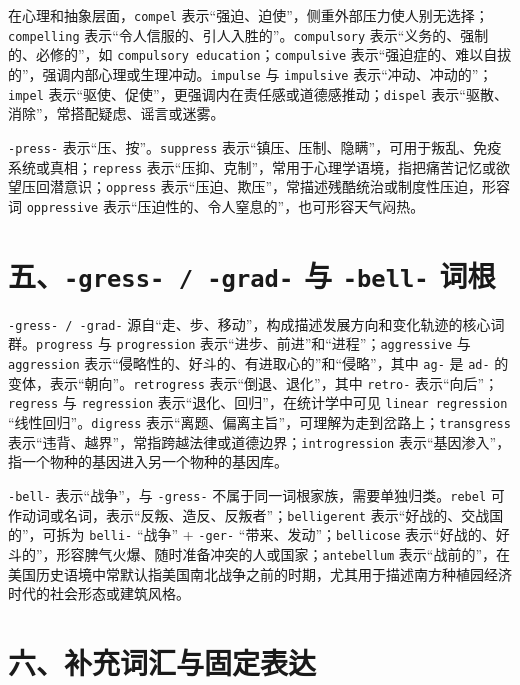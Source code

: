 \documentclass[UTF8,zihao=-4]{ctexart}
\begin{document}
在心理和抽象层面，\texttt{compel} 表示“强迫、迫使”，侧重外部压力使人别无选择；\texttt{compelling} 表示“令人信服的、引人入胜的”。\texttt{compulsory} 表示“义务的、强制的、必修的”，如 \texttt{compulsory education}；\texttt{compulsive} 表示“强迫症的、难以自拔的”，强调内部心理或生理冲动。\texttt{impulse} 与 \texttt{impulsive} 表示“冲动、冲动的”；\texttt{impel} 表示“驱使、促使”，更强调内在责任感或道德感推动；\texttt{dispel} 表示“驱散、消除”，常搭配疑虑、谣言或迷雾。

\texttt{-press-} 表示“压、按”。\texttt{suppress} 表示“镇压、压制、隐瞒”，可用于叛乱、免疫系统或真相；\texttt{repress} 表示“压抑、克制”，常用于心理学语境，指把痛苦记忆或欲望压回潜意识；\texttt{oppress} 表示“压迫、欺压”，常描述残酷统治或制度性压迫，形容词 \texttt{oppressive} 表示“压迫性的、令人窒息的”，也可形容天气闷热。

\section*{五、\texttt{-gress- / -grad-} 与 \texttt{-bell-} 词根}

\texttt{-gress- / -grad-} 源自“走、步、移动”，构成描述发展方向和变化轨迹的核心词群。\texttt{progress} 与 \texttt{progression} 表示“进步、前进”和“进程”；\texttt{aggressive} 与 \texttt{aggression} 表示“侵略性的、好斗的、有进取心的”和“侵略”，其中 \texttt{ag-} 是 \texttt{ad-} 的变体，表示“朝向”。\texttt{retrogress} 表示“倒退、退化”，其中 \texttt{retro-} 表示“向后”；\texttt{regress} 与 \texttt{regression} 表示“退化、回归”，在统计学中可见 \texttt{linear regression} “线性回归”。\texttt{digress} 表示“离题、偏离主旨”，可理解为走到岔路上；\texttt{transgress} 表示“违背、越界”，常指跨越法律或道德边界；\texttt{introgression} 表示“基因渗入”，指一个物种的基因进入另一个物种的基因库。

\texttt{-bell-} 表示“战争”，与 \texttt{-gress-} 不属于同一词根家族，需要单独归类。\texttt{rebel} 可作动词或名词，表示“反叛、造反、反叛者”；\texttt{belligerent} 表示“好战的、交战国的”，可拆为 \texttt{belli-} “战争” + \texttt{-ger-} “带来、发动”；\texttt{bellicose} 表示“好战的、好斗的”，形容脾气火爆、随时准备冲突的人或国家；\texttt{antebellum} 表示“战前的”，在美国历史语境中常默认指美国南北战争之前的时期，尤其用于描述南方种植园经济时代的社会形态或建筑风格。

\section*{六、补充词汇与固定表达}
\end{document}
